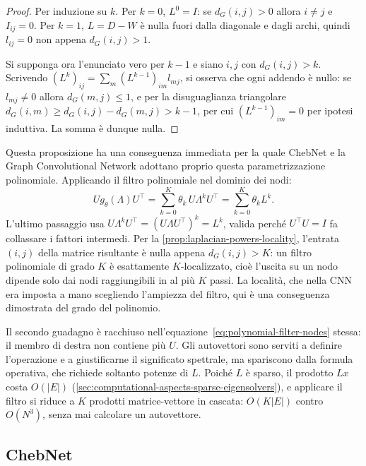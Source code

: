\begin{proof}
Per induzione su $k$. Per $k=0$, $L^0=I$: se $d_G(i,j)>0$ allora $i\neq j$ e $I_{ij}=0$. Per $k=1$, $L=D-W$ è nulla fuori dalla diagonale e dagli archi, quindi $l_{ij}=0$ non appena $d_G(i,j)>1$.

Si supponga ora l'enunciato vero per $k-1$ e siano $i,j$ con $d_G(i,j)>k$. Scrivendo $(L^k)_{ij}=\sum_m (L^{k-1})_{im}l_{mj}$, si osserva che ogni addendo è nullo: se $l_{mj}\neq0$ allora $d_G(m,j)\leq1$, e per la disuguaglianza triangolare $d_G(i,m)\geq d_G(i,j)-d_G(m,j) > k-1$, per cui $(L^{k-1})_{im}=0$ per ipotesi induttiva. La somma è dunque nulla. \qedhere
\end{proof}

Questa proposizione ha una conseguenza immediata per la quale ChebNet e la Graph Convolutional Network adottano proprio questa parametrizzazione polinomiale. Applicando il filtro polinomiale nel dominio dei nodi:
\begin{equation}
\label{eq:polynomial-filter-nodes}
U g_\theta(\Lambda)U^\top = \sum_{k=0}^{K}\theta_k\,U\Lambda^kU^\top = \sum_{k=0}^{K}\theta_k L^k.
\end{equation}
L'ultimo passaggio usa $U\Lambda^kU^\top = (U\Lambda U^\top)^k = L^k$, valida perché $U^\top U=I$ fa collassare i fattori intermedi. Per la \cref{prop:laplacian-powers-locality}, l'entrata $(i,j)$ della matrice risultante è nulla appena $d_G(i,j)>K$: un filtro polinomiale di grado $K$ è esattamente $K$-localizzato, cioè l'uscita su un nodo dipende solo dai nodi raggiungibili in al più $K$ passi. La località, che nella CNN era imposta a mano scegliendo l'ampiezza del filtro, qui è una conseguenza dimostrata del grado del polinomio.

Il secondo guadagno è racchiuso nell'equazione~\eqref{eq:polynomial-filter-nodes} stessa: il membro di destra non contiene più $U$. Gli autovettori sono serviti a definire l'operazione e a giustificarne il significato spettrale, ma spariscono dalla formula operativa, che richiede soltanto potenze di $L$. Poiché $L$ è sparso, il prodotto $Lx$ costa $O(|E|)$ (\cref{sec:computational-aspects-sparse-eigensolvers}), e applicare il filtro si riduce a $K$ prodotti matrice-vettore in cascata: $O(K|E|)$ contro $O(N^3)$, senza mai calcolare un autovettore.

\subsection{ChebNet}

